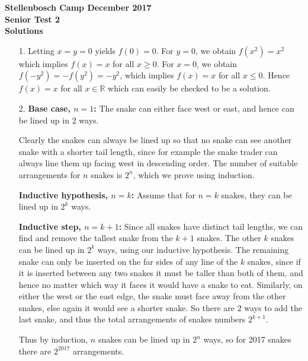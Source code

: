 \documentclass[a4paper, 12pt]{article}
\begin{document}
\begin{center}
\textbf{Stellenbosch Camp December 2017 \\ Senior Test 2} \\
\textbf{Solutions}
\end{center}

\begin{enumerate}

    \item[1.] Letting $x = y = 0$ yields $f(0) = 0$. For $y = 0$, we obtain $f(x^2) = x^2$ which implies $f(x) = x$ for all $x \geq 0$. For $x = 0$, we obtain $f(-y^2) = -f(y^2) = -y^2$, which implies $f(x) = x$ for all $x \leq 0$. Hence $f(x) = x$ for all $x \in \mathbb{R}$ which can easily be checked to be a solution.
    
    
    \item[2.] \textbf{Base case, $n =1$:} The snake can either face west or east, and hence can be lined up in 2 ways.
    
    Clearly the snakes can always be lined up so that no snake can see another snake with a shorter tail length, since for example the snake trader can always line them up facing west in descending order. The number of suitable arrangements for $n$ snakes is $2^n$, which we prove using induction.
    
    \textbf{Inductive hypothesis, $n=k$:} Assume that for $n=k$ snakes, they can be lined up in $2^k$ ways.
    
    \textbf{Inductive step, $n=k+1$:} Since all snakes have distinct tail lengths, we can find and remove the tallest snake from the $k+1$ snakes. The other $k$ snakes can be lined up in $2^k$ ways, using our inductive hypothesis. The remaining snake can only be inserted on the far sides of any line of the $k$ snakes, since if it is inserted between any two snakes it must be taller than both of them, and hence no matter which way it faces it would have a snake to eat. Similarly, on either the west or the east edge, the snake must face away from the other snakes, else again it would see a shorter snake. So there are 2 ways to add the last snake, and thus the total arrangements of snakes numbers $2^{k+1}$.
    
    Thus by induction, $n$ snakes can be lined up in $2^n$ ways, so for 2017 snakes there are $2^{2017}$ arrangements.
    

\end{enumerate}
\end{document}
